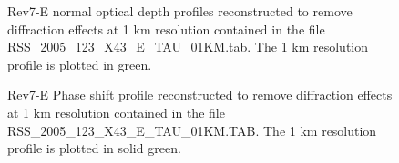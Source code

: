 \documentclass[crop=false,class=book]{standalone}
\begin{document}
\begin{figure}[H]
    \centering
    \caption[Normal Optical Depth Profiles 130000-145000km]{Rev7-E normal optical depth profiles reconstructed to remove diffraction effects at 1 km resolution contained in the file RSS\_2005\_123\_X43\_E\_TAU\_01KM.tab. The 1 km resolution profile is plotted in green.}
\end{figure}
\begin{figure}[H]
    \centering
    \caption[Phase Shift Profile]{Rev7-E Phase shift profile reconstructed to remove diffraction effects at 1 km resolution contained in the file RSS\_2005\_123\_X43\_E\_TAU\_01KM.TAB. The 1 km resolution profile is plotted in solid green.}
\end{figure}
\end{document}
